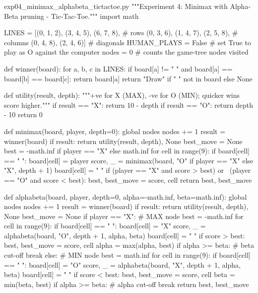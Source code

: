 \documentclass[11pt,a4paper]{article}
\begin{document}
\begin{pycode}{exp04\_minimax\_alphabeta\_tictactoe.py}
"""Experiment 4: Minimax with Alpha-Beta pruning - Tic-Tac-Toe."""
import math

LINES = [(0, 1, 2), (3, 4, 5), (6, 7, 8),      # rows
         (0, 3, 6), (1, 4, 7), (2, 5, 8),      # columns
         (0, 4, 8), (2, 4, 6)]                 # diagonals
HUMAN_PLAYS = False        # set True to play as O against the computer
nodes = 0                  # counts the game-tree nodes visited


def winner(board):
    for a, b, c in LINES:
        if board[a] != " " and board[a] == board[b] == board[c]:
            return board[a]
    return "Draw" if " " not in board else None


def utility(result, depth):
    """+ve for X (MAX), -ve for O (MIN); quicker wins score higher."""
    if result == "X":
        return 10 - depth
    if result == "O":
        return depth - 10
    return 0


def minimax(board, player, depth=0):
    global nodes
    nodes += 1
    result = winner(board)
    if result:
        return utility(result, depth), None
    best_move = None
    best = -math.inf if player == "X" else math.inf
    for cell in range(9):
        if board[cell] == " ":
            board[cell] = player
            score, _ = minimax(board, "O" if player == "X" else "X", depth + 1)
            board[cell] = " "
            if (player == "X" and score > best) or \
               (player == "O" and score < best):
                best, best_move = score, cell
    return best, best_move


def alphabeta(board, player, depth=0, alpha=-math.inf, beta=math.inf):
    global nodes
    nodes += 1
    result = winner(board)
    if result:
        return utility(result, depth), None
    best_move = None
    if player == "X":                               # MAX node
        best = -math.inf
        for cell in range(9):
            if board[cell] == " ":
                board[cell] = "X"
                score, _ = alphabeta(board, "O", depth + 1, alpha, beta)
                board[cell] = " "
                if score > best:
                    best, best_move = score, cell
                alpha = max(alpha, best)
                if alpha >= beta:                   # beta cut-off
                    break
    else:                                           # MIN node
        best = math.inf
        for cell in range(9):
            if board[cell] == " ":
                board[cell] = "O"
                score, _ = alphabeta(board, "X", depth + 1, alpha, beta)
                board[cell] = " "
                if score < best:
                    best, best_move = score, cell
                beta = min(beta, best)
                if alpha >= beta:                   # alpha cut-off
                    break
    return best, best_move



\end{pycode}
\end{document}
